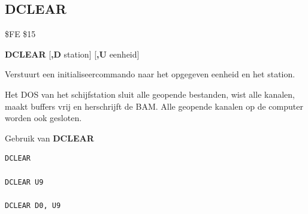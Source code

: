 
\newpage
\subsection{DCLEAR}
\begin{description}[leftmargin=2cm,style=nextline]
\item [Token:]    \$FE \$15

\item [Formaat:]   {\bf DCLEAR} [{\bf,D} station] [{\bf,U} eenheid]

\item [Gebruik:]    Verstuurt een initialiseercommando naar het opgegeven eenheid en het station.

                  \drivedefinition

                  \unitdefinition

                  Het DOS van het schijfstation sluit alle geopende bestanden, wist alle kanalen, maakt buffers vrij en herschrijft de BAM. Alle geopende kanalen op de computer worden ook gesloten.

\item [Voorbeelden:] Gebruik van {\bf DCLEAR}

\begin{tcolorbox}[colback=black,coltext=white]
\verbatimfont{\codefont}
\begin{verbatim}
DCLEAR

DCLEAR U9

DCLEAR D0, U9
\end{verbatim}
\end{tcolorbox}
\end{description}


\newpage
